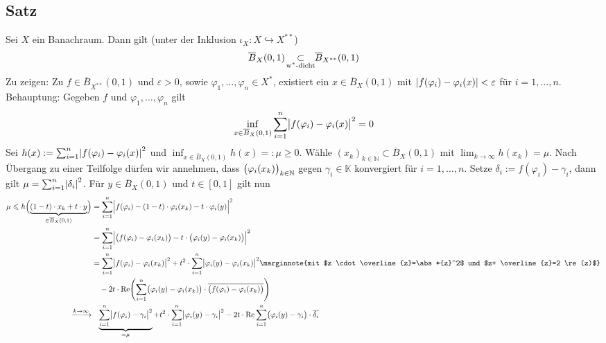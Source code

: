 \subsection[Satz: Einheitskugel eines Banachraumes $X$ liegt $\w^*$-dicht in Einheitskugel von $X^{**}$]{Satz} %
\label{sub:516}
Sei $X$ ein Banachraum. Dann gilt (unter der Inklusion $\iota_X \colon X \hookrightarrow X^{**}$)
\[
	\overline{B}_X(0,1)\! \underset{\text{$\w^*$-dicht}}{\subset}\!\! \overline{B}_{X^{**}}(0,1)
\]
Zu zeigen: Zu $f \in \overline{B}_{X^{**}}(0,1)$ und $\varepsilon>0$, sowie $\varphi_1, \ldots , \varphi_n \in X^*$, existiert ein $x \in \overline{B}_X(0,1)$ mit
$\abs*{f(\varphi_i)- \varphi_i(x)} < \varepsilon$ für $i=1,\ldots ,n$. Behauptung: Gegeben $f$ und $\varphi_1, \ldots , \varphi_n$ gilt
\[
	\inf_{x \in \overline{B}_X(0,1)} \sum_{i=1}^{n} \abs[\big]{f(\varphi_i)- \varphi_i(x)}^2 = 0
\]
Sei $h(x) := \sum_{i=1}^{n} \abs*{f(\varphi_i)- \varphi_i(x)}^2 $ und $\inf_{x\in \overline{B}_X(0,1)} h(x) =: \mu \ge 0$. Wähle 
$(x_k)_{k \in \mathds{N}} \subset \overline{B}_X(0,1)$ mit $\lim_{k \to \infty} h(x_k)= \mu$. Nach Übergang zu einer Teilfolge dürfen wir annehmen, dass 
$\enbrace[\big]{\varphi_i(x_k)}_{k \in \mathds{N}}$ gegen  $\gamma_i \in \mathds{K}$ konvergiert für $i=1,\ldots ,n$. Setze $\delta_i := f(\varphi_i) -\gamma_i$, dann
gilt $\mu = \sum_{i=1}^{n} \abs*{\delta_i}^2$. Für $y \in \overline{B}_X(0,1)$ und $t \in [0,1]$ gilt nun
\begin{align*}
	\mu \le h\enbrace[\Big]{\underbrace{(1-t) \cdot x_k + t \cdot y}_{\in \overline{B}_X(0,1)}} &= 
	\sum_{i=1}^{n} \abs[\Big]{f(\varphi_i)- (1-t) \cdot \varphi_i(x_k) - t \cdot \varphi_i(y)}^2 \\
	&= \sum_{i=1}^{n} \abs[\Big]{\enbrace[\big]{f(\varphi_i)- \varphi_i(x_k)} - t \cdot  \enbrace[\big]{\varphi_i(y)- \varphi_i(x_k)} }^2 \\
	&= \sum_{i=1}^{n} \abs[\big]{f(\varphi_i)- \varphi_i(x_k)}^2 + t^2 \cdot \sum_{i=1}^{n} \abs[\big]{\varphi_i(y)- \varphi_i(x_k)}^2 \marginnote{mit $z \cdot 
	\overline{z}=\abs*{z}^2$ und $z+ \overline{z}=2 \re(z)$}\\
	& \quad - 2 t \cdot \re \enbrace*{\sum_{i=1}^{n} \enbrace[\big]{\varphi_i(y)- \varphi_i(x_k)} \cdot \overline{\enbrace[\big]{f(\varphi_i)- \varphi_i(x_k)} }} \\
	\xrightarrow{k \to \infty} &\hphantom{=} \underbrace{\sum_{i=1}^{n} \abs[\big]{f(\varphi_i)- \gamma_i}^2}_{=\mu} + t^2 \cdot \sum_{i=1}^{n} \abs[\big]{\varphi_i(y)- \gamma_i}^2  
	-2 t \cdot \re \sum_{i=1}^{n} \enbrace[\big]{\varphi_i(y)- \gamma_i} \cdot \overline{\delta_i }
\end{align*}
